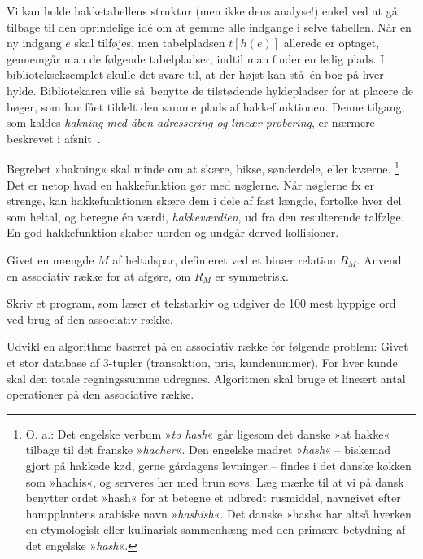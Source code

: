 Vi kan holde hakketabellens struktur (men ikke dens analyse!) enkel ved at gå tilbage til den oprindelige idé om at gemme alle indgange i selve tabellen.
Når en ny indgang $e$ skal tilføjes, men tabelpladsen $t[h(e)]$ allerede er optaget, gennemgår man de følgende tabelpladser, indtil man finder en ledig plads.
I bibliotekseksemplet skulle det svare til, at der højst kan stå én bog på hver hylde.
Bibliotekaren ville så benytte de tilstødende hyldepladser for at placere de bøger, som har fået tildelt den samme plads af hakkefunktionen.
Denne tilgang, som kaldes 
\emph{hakning med åben adressering og lineær probering},
er nærmere beskrevet i afsnit~.

Begrebet »hakning« skal minde om at skære, bikse, sønderdele, eller kværne.
\footnote{O. a.: Det engelske verbum »\emph{to hash}« går ligesom det danske »at hakke« tilbage til det franske  »\emph{hacher}«.
  Den engelske madret »\emph{hash}« -- biskemad gjort på hakkede kød, gerne gårdagens levninger -- findes i det danske køkken som »hachis«, og serveres her med brun sovs.
  Læg mærke til at vi på dansk benytter ordet »hash«  for at betegne et udbredt rusmiddel, navngivet efter hampplantens arabiske navn »\emph{hashish}«.
  Det danske »hash« har altså hverken en etymologisk eller kulinarisk sammenhæng med den primære betydning af det engelske »\emph{hash}«.
  }
Det er netop hvad en hakkefunktion gør med nøglerne.
Når nøglerne fx er strenge, kan hakkefunktionen skære dem i dele af fast længde, fortolke hver del som heltal, og beregne én værdi, \emph{hakkeværdien}, ud fra den resulterende talfølge.
En god hakkefunktion skaber uorden og undgår derved kollisioner.

\begin{exerc}
  Givet en mængde $M$ af heltalspar, definieret ved et binær relation $R_M$.
  Anvend en associativ række for at afgøre, om $R_M$ er symmetrisk.
\end{exerc}

\begin{exerc}
  Skriv et program, som læser et tekstarkiv og udgiver de 100 mest hyppige ord ved brug af den associativ  række.
\end{exerc}

\begin{exerc}[Et regnskabssystem] 
  Udvikl en algorithme baseret på en associativ række før følgende problem:
  Givet et stor database af 3-tupler (transaktion, pris, kundenummer).
  For hver kunde skal den totale regningssumme udregnes.
  Algoritmen skal bruge et lineært antal operationer på den associative række.
\end{exerc}

